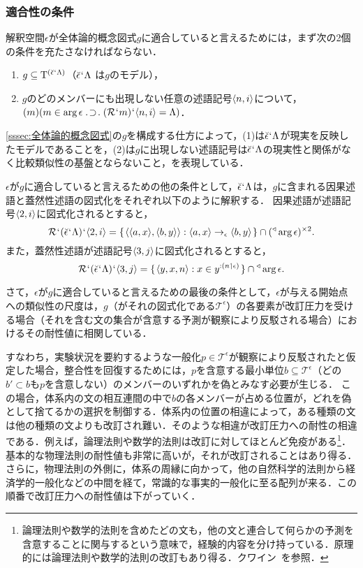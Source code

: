 \subsubsection{適合性の条件}
\label{sssec:適合性の条件}

解釈空間$ \epsilon $が全体論的概念図式$ g $に適合していると言えるためには，まず次の2個の条件を充たさなければならない．
\begin{enumerate}[label=(\arabic*)]
    \item $g\subseteq \mathrm{T}^{(\breve{\epsilon}{\mspace{1mu}{`}\mspace{1mu}}\Lambda)}$（$\breve{\epsilon}{\mspace{1mu}{`}\mspace{1mu}}\Lambda$ は$g$のモデル），
    \item $g$のどのメンバーにも出現しない任意の述語記号$\langle n,i \rangle$について，\\\hfill
    $(m)(m\in\arg\epsilon\case{1}{1}{1}(\mathcal{R}\fap m)\fap\orp{n,i}=\Lambda)$．
\end{enumerate}
\ref{sssec:全体論的概念図式}の$g$を構成する仕方によって，(1)は$\breve{\epsilon}{\mspace{1mu}{`}\mspace{1mu}}\Lambda$が現実を反映したモデルであることを，(2)は$g$に出現しない述語記号は$\breve{\epsilon}{\mspace{1mu}{`}\mspace{1mu}}\Lambda$の現実性と関係がなく比較類似性の基盤とならないこと，を表現している．

$\epsilon$が$g$に適合していると言えるための他の条件として，$\breve{\epsilon}{\mspace{1mu}{`}\mspace{1mu}}\Lambda $は，$g$に含まれる因果述語と蓋然性述語の図式化をそれぞれ以下のように解釈する．
因果述語が述語記号$\langle 2,i \rangle$に図式化されるとすると，
\[
    \mathcal{R}{\mspace{1mu}{`}\mspace{1mu}}(\breve{\epsilon}{\mspace{1mu}{`}\mspace{1mu}}\Lambda){\mspace{1mu}{`}\mspace{1mu}}\langle 2,i \rangle = \{\mspace{2mu}\langle \langle a,x \rangle,\langle b,y \rangle \rangle:
        \langle a,x \rangle\to_{\epsilon}\langle b,y \rangle
    \mspace{2mu}\}\cap ({^\triangleleft}\arg\epsilon)^{\times 2}.
\]
また，蓋然性述語が述語記号$\langle 3,j \rangle$に図式化されるとすると，
\[
    \mathcal{R}{\mspace{1mu}{`}\mspace{1mu}}(\breve{\epsilon}{\mspace{1mu}{`}\mspace{1mu}}\Lambda){\mspace{1mu}{`}\mspace{1mu}}\langle 3,j \rangle = \{\mspace{2mu}\langle y,x,n \rangle:
        x\in y^{:(n\mathbin{\upharpoonleft}\epsilon)}
    \mspace{2mu}\}\cap{^\triangleleft}\arg\epsilon.
\]

さて，$\epsilon$が$g$に適合していると言えるための最後の条件として，$\epsilon$が与える開始点への類似性の尺度は，$g$（がそれの図式化である$\mathcal{T}^\epsilon$）の各要素が改訂圧力を受ける場合（それを含む文の集合が含意する予測が観察により反駁される場合）におけるその耐性値に相関している．

すなわち，実験状況を要約するような一般化$p\in\mathcal{T}^\epsilon$が観察により反駁されたと仮定した場合，整合性を回復するためには，$p$を含意する最小単位$b\subseteq \mathcal{T}^\epsilon$（どの$b'\subset b$も$p$を含意しない）のメンバーのいずれかを偽とみなす必要が生じる．
この場合，体系内の文の相互連間の中で$b$の各メンバーが占める位置が，どれを偽として捨てるかの選択を制御する．体系内の位置の相違によって，ある種類の文は他の種類の文よりも改訂され難い．そのような相違が改訂圧力への耐性の相違である．例えば，論理法則や数学的法則は改訂に対してほとんど免疫がある\footnote{
    論理法則や数学的法則を含めたどの文も，他の文と連合して何らかの予測を含意することに関与するという意味で，経験的内容を分け持っている．原理的には論理法則や数学的法則の改訂もあり得る．クワイン~\cite[pp.\,2--4]{クワインb}を参照．
}．基本的な物理法則の耐性値も非常に高いが，それが改訂されることはあり得る．さらに，物理法則の外側に，体系の周縁に向かって，他の自然科学的法則から経済学的一般化などの中間を経て，常識的な事実的一般化に至る配列が来る．この順番で改訂圧力への耐性値は下がっていく．

